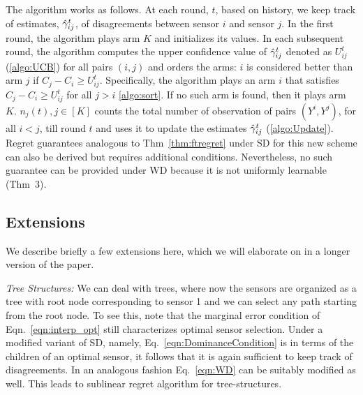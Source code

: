 The algorithm works as follows. At each round, $t$, based on history, we keep track of estimates, $\hat{\gamma}^t_{ij}$, of disagreements between sensor $i$ and sensor $j$.  %
In the first round, the algorithm plays arm $K$ and initializes its values. In each subsequent round, the algorithm computes the upper confidence value of $\hat{\gamma}^t_{ij}$ denoted as $U^t_{ij}$ (\ref{algo:UCB}) for all pairs $(i,j)$ and orders the arms: $i$ is considered better than arm $j$ if $C_j-C_i \geq U^t_{ij}$. Specifically, the algorithm plays an arm $i$ that satisfies $C_j-C_i \geq U^t_{ij}$ for all $j>i$ \ref{algo:sort}. If no such arm is found, then it plays arm $K$.  $n_j(t), j\in [K] $ counts the total number of observation of pairs $(Y^i, Y^j)$, for all $i<j$, till round $t$ and uses it to update the estimates $\hat{\gamma}_{ij}^t$ (\ref{algo:Update}). Regret guarantees analogous to Thm~\ref{thm:ftregret} under SD for this new scheme can also be derived but requires additional conditions. Nevertheless, no such guarantee can be provided under WD because it is not uniformly learnable (Thm~3). %
\subsection{Extensions} 
We describe briefly a few extensions here, which we will elaborate on in a longer version of the paper.

\noindent
{\it Tree Structures:}
We can deal with trees, where now the sensors are organized as a tree with root node corresponding to sensor 1 and we can select any path starting from the root node. To see this, note that the marginal error condition of Eqn.~\ref{eqn:interp_opt} still characterizes optimal sensor selection. Under a modified variant of SD, namely, Eq.~\ref{eqn:DominanceCondition} is in terms of the children of an optimal sensor, it follows that it is again sufficient to keep track of disagreements. In an analogous fashion Eq.~\ref{eqn:WD} can be suitably modified as well. This leads to sublinear regret algorithm for tree-structures. %

